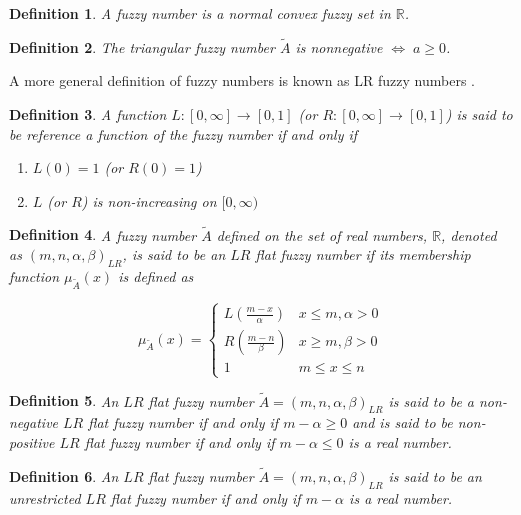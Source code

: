 \documentclass[ee,msthesis]{usuthesis}
\newtheorem{definition}{Definition}[section]
\begin{document}
\begin{definition}
A fuzzy number is a normal convex fuzzy set in \(\mathbb{R}\).
\end{definition}

\begin{definition}
The triangular fuzzy number \(\tilde{A}\) is nonnegative \(\iff\; a \ge 0\).
\end{definition}

A more general definition of fuzzy numbers is known as LR fuzzy numbers
\cite{kaur-2016-introd-fuzzy,zimmermann-2001-fuzzy-set}.

\begin{definition}
A function \(L:[0,\infty] \rightarrow [0,1]\) (or \(R:[0,\infty] \rightarrow [0,1]\)) is said to be reference a function of the fuzzy number if and only
if

\begin{enumerate}
\item \(L(0) = 1\) (or \(R(0) = 1\))
\item \(L\) (or \(R\)) is non-increasing on \([0,\infty)\)
\end{enumerate}
\end{definition}

\begin{definition}
A fuzzy number \(\tilde{A}\) defined on the set of real numbers, \(\mathbb{R}\), denoted as \((m,n,\alpha,\beta)_{LR}\), is said to be an \(LR\)
flat fuzzy number if its membership function \(\mu_{\tilde{A}}(x)\) is defined as

\begin{equation}
\mu_{\tilde{A}}(x) =
\begin{cases}
L(\frac{m-x}{\alpha}) & x \le m, \alpha > 0 \\
R(\frac{m-n}{\beta}) & x \ge m, \beta > 0 \\
1                & m \le x \le n
\end{cases}
\end{equation}
\end{definition}

\begin{definition}
An \(LR\) flat fuzzy number \(\tilde{A} = (m,n,\alpha,\beta)_{LR}\) is said to be a non-negative \(LR\) flat fuzzy number if and only
if \(m-\alpha \ge 0\) and is said to be non-positive \(LR\) flat fuzzy number if and only if \(m - \alpha \le 0\) is a real number.
\end{definition}

\begin{definition}
An \(LR\) flat fuzzy number \(\tilde{A} = (m,n,\alpha,\beta)_{LR}\) is said to be an unrestricted \(LR\) flat fuzzy number if and only
if \(m - \alpha\) is a real number.
\end{definition}
\end{document}
